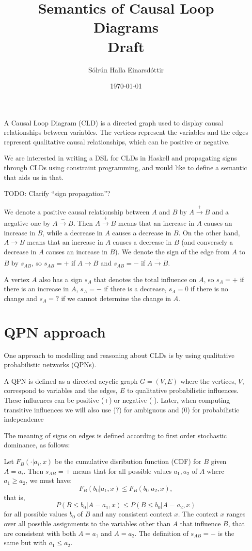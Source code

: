 \documentclass[a4paper,11pt]{article}
\title{Semantics of Causal Loop Diagrams\\ Draft}
\author{Sólrún Halla Einarsdóttir}
\date{\today}
\begin{document}
\maketitle
A Causal Loop Diagram (CLD) is a directed graph used to display causal
relationships between variables.
%
The vertices represent the variables and the edges represent qualitative
causal relationships, which can be positive or negative.

We are interested in writing a DSL for CLDs in Haskell and propagating
signs through CLDs using constraint programming, and would like to
define a semantic that aids us in that.

TODO: Clarify ``sign propagation''?

We denote a positive causal relationship between $A$ and $B$ by
$A\xrightarrow{+} B$ and a negative one by $A \xrightarrow{-} B$.
%
Then $A \xrightarrow{+} B$ means that an increase in $A$ causes an
increase in $B$, while a decrease in $A$ causes a decrease in $B$.
%
On the other hand, $A\xrightarrow{-} B$ means that an increase in $A$
causes a decrease in $B$ (and conversely a decrease in $A$ causes an
increase in $B$).
%
We denote the sign of the edge from $A$ to $B$ by $s_{AB}$, so
$s_{AB}= +$ if $A\xrightarrow{+} B$ and $s_{AB}=-$ if
$A\xrightarrow{-} B$.


A vertex $A$ also has a sign $s_A$ that denotes the total influence on $A$, so
$s_A=+$ if there is an increase in $A$, $s_A=-$ if there is a decrease, $s_A=0$
if there is no change and $s_A=?$ if we cannot determine the change in $A$.

\section{QPN approach}

One approach to modelling and reasoning about CLDs is by using qualitative
probabilistic networks (QPNs).

A QPN is defined as a directed
acyclic graph $G=(V,E)$ where the vertices, $V$, correspond to
variables and the edges, $E$ to qualitative probabilistic influences.
%
These influences can be positive (+) or negative (-).
%
Later, when computing transitive influences we will also use (?) for
ambiguous and (0) for probabilistic independence

The meaning of signs on edges is defined according to first order
stochastic dominance, as follows:

Let $F_B(\cdot|a_i, x)$ be the cumulative disribution function (CDF) for
$B$ given $A=a_i$. Then $s_{AB}=+$ means that for all possible values
$a_1,a_2$ of $A$ where $a_1\geq a_2$, we must have:
\[F_B(b_0|a_1, x)\leq F_B(b_0|a_2, x),\]
that is,
\[P(B \leq b_0| A = a_1, x)\leq P(B\leq b_0| A = a_2, x)\]
for all possible values $b_0$ of $B$ and any consistent context $x$.
The context $x$ ranges over all possible assignments to the
variables other than $A$ that influence $B$, that are consistent with both
$A=a_1$ and $A=a_2$.
%
The definition of $s_{AB}=-$ is the same but with $a_1\leq a_2$.
\end{document}
